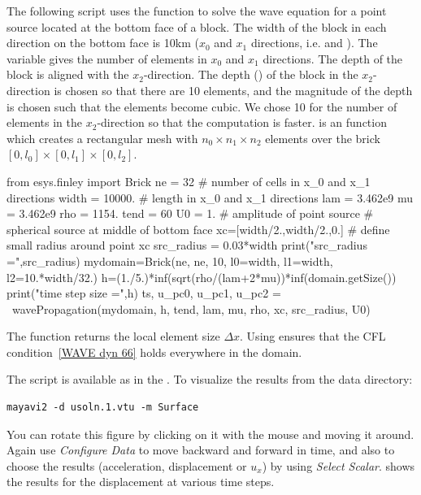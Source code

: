 The following script uses the  function to solve the
wave equation for a point source located at the bottom face of a block.
The width of the block in each direction on the bottom face is 10km
($x_0$ and $x_1$ directions, i.e.  and ).
The variable  gives the number of elements in $x_{0}$ and $x_1$ directions.
The depth of the block is aligned with the $x_{2}$-direction.
The depth () of the block in the $x_{2}$-direction is chosen
so that there are 10 elements, and the magnitude of the depth is chosen such
that the elements become cubic.
We chose 10 for the number of elements in the $x_{2}$-direction so
that the computation is faster. 
is an \finley function which creates a rectangular mesh with $n_0 \times n_1 \times n_2$
elements over the brick $[0,l_0] \times [0,l_1] \times [0,l_2]$.
\begin{python}
  from esys.finley import Brick
  ne = 32          # number of cells in x_0 and x_1 directions
  width = 10000.   # length in x_0 and x_1 directions
  lam = 3.462e9
  mu = 3.462e9
  rho = 1154.
  tend = 60
  U0 = 1. # amplitude of point source
  # spherical source at middle of bottom face
  xc=[width/2.,width/2.,0.]
  # define small radius around point xc
  src_radius = 0.03*width
  print("src_radius =",src_radius)
  mydomain=Brick(ne, ne, 10, l0=width, l1=width, l2=10.*width/32.)
  h=(1./5.)*inf(sqrt(rho/(lam+2*mu))*inf(domain.getSize())
  print("time step size =",h)
  ts, u_pc0, u_pc1, u_pc2 =  \
          wavePropagation(mydomain, h, tend, lam, mu, rho, xc, src_radius, U0)
\end{python}
The  function returns the local element size $\Delta x$.
Using \function{inf} ensures that the CFL condition~\ref{WAVE dyn 66}  holds
everywhere in the domain. 

The script is available as  in the \ExampleDirectory{}. 
To visualize the results from the data directory:
\begin{verbatim} 
mayavi2 -d usoln.1.vtu -m Surface
\end{verbatim}
You can rotate this figure by clicking on it with the mouse and moving it around.
Again use \emph{Configure Data} to move backward and forward in time, and
also to choose the results (acceleration, displacement or $u_x$) by
using \emph{Select Scalar}.
 shows the results for the displacement at various time steps.

